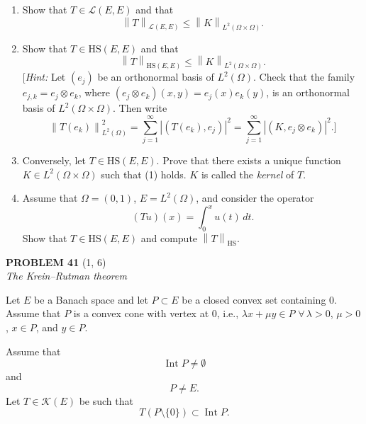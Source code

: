 \documentclass[12pt]{article}
\newcommand{\norm}[1]{\left\|#1\right\|}
\newcommand{\abs}[1]{\left|#1\right|}
\begin{document}
\begin{enumerate}
\item Show that $T \in \mathcal{L}(E,E)$ and that
\[
\norm{T}_{\mathcal{L}(E,E)} \le \norm{K}_{L^2(\Omega\times\Omega)}.
\]
 
\item Show that $T \in \mathrm{HS}(E,E)$ and that
\[
\norm{T}_{\mathrm{HS}(E,E)} \le \norm{K}_{L^2(\Omega\times\Omega)}.
\]
[\textit{Hint:} Let $(e_j)$ be an orthonormal basis of $L^2(\Omega)$. Check that the family
$e_{j,k} = e_j \otimes e_k$, where $(e_j \otimes e_k)(x,y) = e_j(x)e_k(y)$, is an orthonormal basis of
$L^2(\Omega \times \Omega)$. Then write
\[
\norm{T(e_k)}^2_{L^2(\Omega)} = \sum_{j=1}^\infty \abs{(T(e_k),e_j)}^2
= \sum_{j=1}^\infty \abs{(K,e_j \otimes e_k)}^2.]
\]
 
\item Conversely, let $T \in \mathrm{HS}(E,E)$. Prove that there exists a unique function
$K \in L^2(\Omega \times \Omega)$ such that (1) holds. $K$ is called the \emph{kernel} of $T$.
 
\noindent[\textit{Hint:} Let $t_{j,k} = (Te_k, e_j)$ and check that $\sum_{j,k=1}^\infty \abs{t_{j,k}}^2 < \infty$.
Define $K = \sum_{j,k=1}^\infty t_{j,k}\, e_j \otimes e_k$ and prove that (1) holds.]
 
\item Assume that $\Omega = (0,1)$, $E = L^2(\Omega)$, and consider the operator
\[
(Tu)(x) = \int_0^x u(t)\,dt.
\]
Show that $T \in \mathrm{HS}(E,E)$ and compute $\norm{T}_{\mathrm{HS}}$.
\end{enumerate}
 
\bigskip
 
\noindent\textbf{PROBLEM 41} (1, 6)\\[4pt]
\textit{The Krein--Rutman theorem}
 
\medskip
 
Let $E$ be a Banach space and let $P \subset E$ be a closed convex set containing $0$.
Assume that $P$ is a convex cone with vertex at $0$, i.e., $\lambda x + \mu y \in P$ $\forall\, \lambda > 0$,
$\mu > 0$, $x \in P$, and $y \in P$.
 
Assume that
\begin{equation}\tag{1}
\operatorname{Int} P \neq \emptyset
\end{equation}
and
\begin{equation}\tag{2}
P \neq E.
\end{equation}
Let $T \in \mathcal{K}(E)$ be such that
\begin{equation}\tag{3}
T(P \setminus \{0\}) \subset \operatorname{Int} P.
\end{equation}
 
\end{document}
